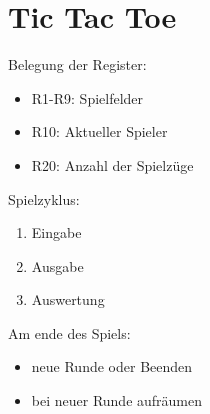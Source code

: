\section{Tic Tac Toe}

\begin{frame}{\insertsection}
 Belegung der Register:
  \begin{itemize}
   \item R1-R9: Spielfelder
   \item R10: Aktueller Spieler
   \item R20: Anzahl der Spielzüge
  \end{itemize}

 Spielzyklus:
  \begin{enumerate}
  \item Eingabe
  \item Ausgabe
  \item Auswertung
  \end{enumerate}


Am ende des Spiels:
\begin{itemize}
 \item neue Runde oder Beenden
 \item bei neuer Runde aufräumen
\end{itemize}
\end{frame}


